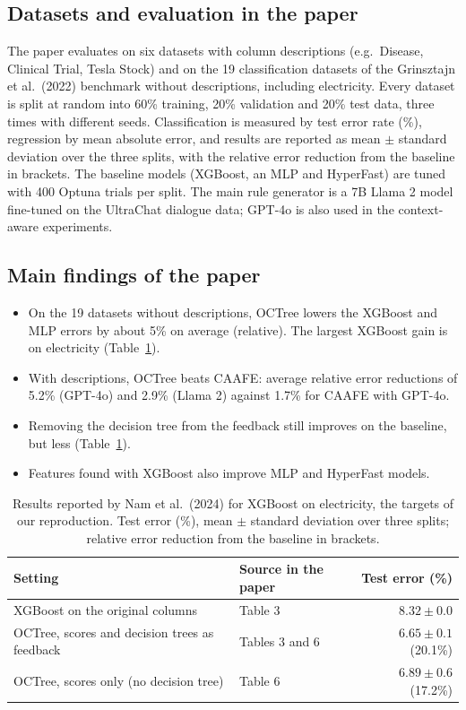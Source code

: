 \documentclass[11pt]{article}
\begin{document}
\subsection{Datasets and evaluation in the paper}
The paper evaluates on six datasets with column descriptions (e.g.\ Disease, Clinical Trial, Tesla
Stock) and on the 19 classification datasets of the Grinsztajn et al.\ (2022) benchmark without
descriptions, including electricity. Every dataset is split at random into 60\% training, 20\%
validation and 20\% test data, three times with different seeds. Classification is measured by test
error rate (\%), regression by mean absolute error, and results are reported as mean $\pm$ standard
deviation over the three splits, with the relative error reduction from the baseline in brackets.
The baseline models (XGBoost, an MLP and HyperFast) are tuned with 400 Optuna trials per split. The
main rule generator is a 7B Llama 2 model fine-tuned on the UltraChat dialogue data; GPT-4o is also
used in the context-aware experiments.

\subsection{Main findings of the paper}
\begin{itemize}
  \item On the 19 datasets without descriptions, OCTree lowers the XGBoost and MLP errors by about
        5\% on average (relative). The largest XGBoost gain is on electricity
        (Table~\ref{tab:paper}).
  \item With descriptions, OCTree beats CAAFE: average relative error reductions of 5.2\% (GPT-4o)
        and 2.9\% (Llama 2) against 1.7\% for CAAFE with GPT-4o.
  \item Removing the decision tree from the feedback still improves on the baseline, but less
        (Table~\ref{tab:paper}).
  \item Features found with XGBoost also improve MLP and HyperFast models.
\end{itemize}

\begin{table}[H]
\centering
\caption{Results reported by Nam et al.\ (2024) for XGBoost on electricity, the targets of our
reproduction. Test error (\%), mean $\pm$ standard deviation over three splits; relative error
reduction from the baseline in brackets.}
\label{tab:paper}
\begin{tabular}{@{}llr@{}}
\toprule
Setting & Source in the paper & Test error (\%) \\
\midrule
XGBoost on the original columns & Table 3 & $8.32\pm0.0$ \\
OCTree, scores and decision trees as feedback & Tables 3 and 6 & $6.65\pm0.1$ (20.1\%) \\
OCTree, scores only (no decision tree) & Table 6 & $6.89\pm0.6$ (17.2\%) \\
\bottomrule
\end{tabular}
\end{table}
\end{document}
